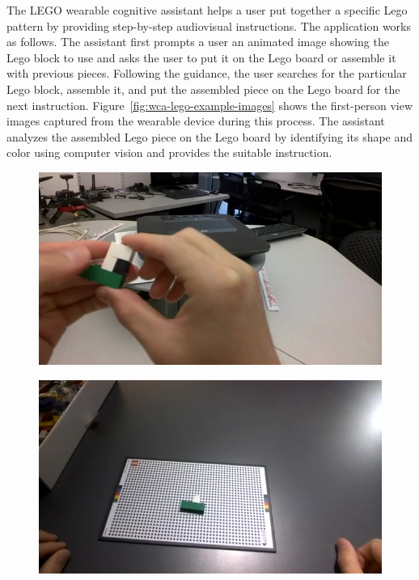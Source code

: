 The LEGO wearable cognitive assistant helps a user put together a specific Lego
pattern by providing step-by-step audiovisual instructions. The application
works as follows. The assistant first prompts a user an animated image showing
the Lego block to use and asks the user to put it on the Lego board or assemble
it with previous pieces. Following the guidance, the user searches for the
particular Lego block, assemble it, and put the assembled piece on the Lego
board for the next instruction. Figure~\ref{fig:wca-lego-example-images} shows
the first-person view images captured from the wearable device during this
process. The assistant analyzes the assembled Lego piece on the Lego board by
identifying its shape and color using computer vision and provides the suitable
instruction.

\begin{figure}
\centering
\begin{minipage}[]{0.31\linewidth}
\centering
\includegraphics[width=\linewidth]{FIGS/lego-dataset-1}\\
\end{minipage}
\begin{minipage}[]{0.31\linewidth}
\centering
\includegraphics[width=\linewidth]{FIGS/lego-dataset-2}\\

\end{minipage}
\end{figure}

